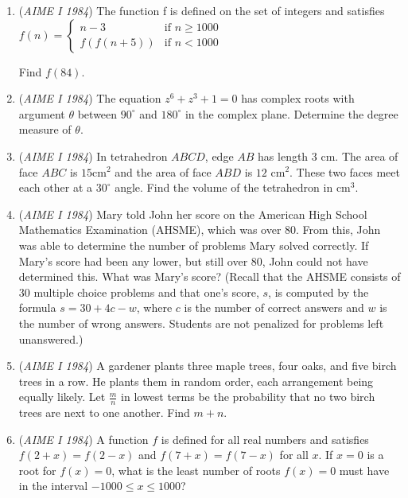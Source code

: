 \begin{enumerate}
 

	\item (\textit{AIME I 1984}) The function f is defined on the set of integers and satisfies
$f(n)= \begin{cases}  n-3 & \mbox{if }n\ge 1000 \\  f(f(n+5)) & \mbox{if }n<1000 \end{cases}$


 Find $f(84)$.


 

	\item (\textit{AIME I 1984}) The equation $z^6+z^3+1=0$ has complex roots with argument $\theta$ between $90^\circ$ and $180^\circ$ in the complex plane. Determine the degree measure of $\theta$.


 

	\item (\textit{AIME I 1984}) In tetrahedron $ABCD$, edge $AB$ has length 3 cm. The area of face $ABC$ is $15\mbox{cm}^2$ and the area of face $ABD$ is $12 \mbox { cm}^2$. These two faces meet each other at a $30^\circ$ angle. Find the volume of the tetrahedron in $\mbox{cm}^3$.


 

	\item (\textit{AIME I 1984}) Mary told John her score on the American High School Mathematics Examination (AHSME), which was over $80$. From this, John was able to determine the number of problems Mary solved correctly. If Mary's score had been any lower, but still over $80$, John could not have determined this. What was Mary's score? (Recall that the AHSME consists of $30$ multiple choice problems and that one's score, $s$, is computed by the formula $s=30+4c-w$, where $c$ is the number of correct answers and $w$ is the number of wrong answers. Students are not penalized for problems left unanswered.)


 

	\item (\textit{AIME I 1984}) A gardener plants three maple trees, four oaks, and five birch trees in a row. He plants them in random order, each arrangement being equally likely. Let $\frac m n$ in lowest terms be the probability that no two birch trees are next to one another. Find $m+n$.


 

	\item (\textit{AIME I 1984}) A function $f$ is defined for all real numbers and satisfies $f(2+x)=f(2-x)$ and $f(7+x)=f(7-x)$ for all $x$. If $x=0$ is a root for $f(x)=0$, what is the least number of roots $f(x)=0$ must have in the interval $-1000\leq x \leq 1000$?



\end{enumerate}
